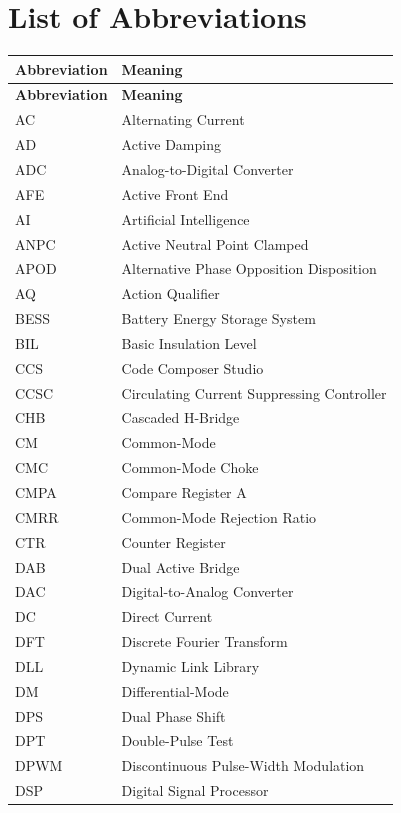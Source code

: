 \chapter*{List of Abbreviations}

\begin{longtable}{@{}p{3.5cm}p{10.5cm}@{}}
\toprule
\textbf{Abbreviation} & \textbf{Meaning} \\
\midrule
\endfirsthead
\toprule
\textbf{Abbreviation} & \textbf{Meaning} \\
\midrule
\endhead
\bottomrule
\endfoot
\bottomrule
\endlastfoot
AC & Alternating Current \\
AD & Active Damping \\
ADC & Analog-to-Digital Converter \\
AFE & Active Front End \\
AI & Artificial Intelligence \\
ANPC & Active Neutral Point Clamped \\
APOD & Alternative Phase Opposition Disposition \\
AQ & Action Qualifier \\
BESS & Battery Energy Storage System \\
BIL & Basic Insulation Level \\
CCS & Code Composer Studio \\
CCSC & Circulating Current Suppressing Controller \\
CHB & Cascaded H-Bridge \\
CM & Common-Mode \\
CMC & Common-Mode Choke \\
CMPA & Compare Register A \\
CMRR & Common-Mode Rejection Ratio \\
CTR & Counter Register \\
DAB & Dual Active Bridge \\
DAC & Digital-to-Analog Converter \\
DC & Direct Current \\
DFT & Discrete Fourier Transform \\
DLL & Dynamic Link Library \\
DM & Differential-Mode \\
DPS & Dual Phase Shift \\
DPT & Double-Pulse Test \\
DPWM & Discontinuous Pulse-Width Modulation \\
DSP & Digital Signal Processor \\

\end{longtable}
